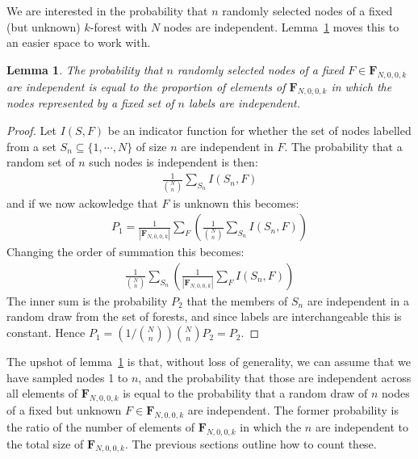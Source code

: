 \documentclass{article}
\newtheorem{lemma}{Lemma}[section]
\newcommand{\fzero}{\mathbf{F}_{N,0,0,k}}
\begin{document}
We are interested in the probability that $n$ randomly selected nodes of a fixed (but unknown) $k$-forest with $N$ nodes are independent. Lemma~\ref{l2} moves this to an easier space to work with.

\begin{lemma}\label{l2}
    The probability that $n$ randomly selected nodes of a fixed $F\in\fzero$ are independent is equal to the proportion of elements of $\fzero$ in which the nodes represented by a fixed set of $n$ labels are independent.
\end{lemma}
\begin{proof}
    Let $I(S, F)$ be an indicator function for whether the set of nodes labelled from a set $S_n\subseteq\{1,\cdots,N\}$ of size $n$ are independent in $F$. The probability that a random set of $n$ such nodes is independent is then:
    \begin{align*}
        \frac{1}{{N \choose n}} \sum_{S_n} I(S_n, F)
    \end{align*}
    and if we now ackowledge that $F$ is unknown this becomes:
        \begin{align*}
        P_1 = \frac{1}{|\fzero|}\sum_F\left(\frac{1}{{N \choose n}} \sum_{S_n} I(S_n, F)\right)
    \end{align*}
    Changing the order of summation this becomes:
    \begin{align*}
        \frac{1}{{N \choose n}}\sum_{S_n}\left(\frac{1}{|\fzero|}\sum_F  I(S_n, F)\right)
    \end{align*}
    The inner sum is the probability $P_2$ that the members of $S_n$ are independent in a random draw from the set of forests, and since labels are interchangeable this is constant. Hence $P_1 = (1/{N\choose n}){N\choose n}P_2=P_2$.
\end{proof}

The upshot of lemma~\ref{l2} is that, without loss of generality, we can assume that we have sampled nodes 1 to $n$, and the probability that those are independent across all elements of $\fzero$ is equal to the probability that a random draw of $n$ nodes of a fixed but unknown $F\in\fzero$ are independent. The former probability is the ratio of the number of elements of $\fzero$ in which the $n$ are independent to the total size of $\fzero$. The previous sections outline how to count these.
\end{document}
